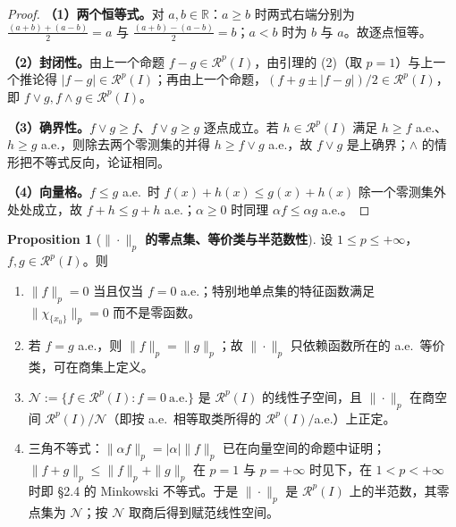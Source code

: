 \documentclass[oneside]{book}
\theoremstyle{definition}
\newcommand{\R}{\mathbb{R}}
\newcommand{\Rc}{\mathcal{R}}
\theoremstyle{definition}
\newtheorem{proposition}{Proposition}[section]
\begin{document}
	\begin{proof}
		\textbf{（1）两个恒等式。}对 $a,b\in\R$：$a\geqslant b$ 时两式右端分别为 $\frac{(a+b)+(a-b)}2=a$ 与 $\frac{(a+b)-(a-b)}2=b$；$a<b$ 时为 $b$ 与 $a$。故逐点恒等。
		
		\textbf{（2）封闭性。}由上一个命题 $f-g\in\Rc^p(I)$，由引理的 (2)（取 $p=1$）与上一个推论得 $|f-g|\in\Rc^p(I)$；再由上一个命题，$(f+g\pm|f-g|)/2\in\Rc^p(I)$，即 $f\vee g,f\wedge g\in\Rc^p(I)$。
		
		\textbf{（3）确界性。}$f\vee g\geqslant f$、$f\vee g\geqslant g$ 逐点成立。若 $h\in\Rc^p(I)$ 满足 $h\geqslant f$ a.e.、$h\geqslant g$ a.e.，则除去两个零测集的并得 $h\geqslant f\vee g$ a.e.，故 $f\vee g$ 是上确界；$\wedge$ 的情形把不等式反向，论证相同。
		
		\textbf{（4）向量格。}$f\leqslant g$ a.e.\ 时 $f(x)+h(x)\leqslant g(x)+h(x)$ 除一个零测集外处处成立，故 $f+h\leqslant g+h$ a.e.；$\alpha\geqslant0$ 时同理 $\alpha f\leqslant\alpha g$ a.e.。
	\end{proof}
	
	\begin{proposition}[\bfseries{$\|\cdot\|_p$ 的零点集、等价类与半范数性}]
		设 $1\leqslant p\leqslant+\infty$，$f,g\in\Rc^p(I)$。则
		\begin{enumerate}[leftmargin=2.4em]
			\item $\|f\|_p=0$ 当且仅当 $f=0$ a.e.；特别地单点集的特征函数满足 $\|\chi_{\{x_0\}}\|_p=0$ 而不是零函数。
			\item 若 $f=g$ a.e.，则 $\|f\|_p=\|g\|_p$；故 $\|\cdot\|_p$ 只依赖函数所在的 a.e.\ 等价类，可在商集上定义。
			\item $\mathcal N:=\{f\in\Rc^p(I):f=0\ \text{a.e.}\}$ 是 $\Rc^p(I)$ 的线性子空间，且 $\|\cdot\|_p$ 在商空间 $\Rc^p(I)/\mathcal N$（即按 a.e.\ 相等取类所得的 $\Rc^p(I)/$a.e.）上正定。
			\item 三角不等式：$\|\alpha f\|_p=|\alpha|\|f\|_p$ 已在向量空间的命题中证明；$\|f+g\|_p\leqslant\|f\|_p+\|g\|_p$ 在 $p=1$ 与 $p=+\infty$ 时见下，在 $1<p<+\infty$ 时即 §2.4 的 Minkowski 不等式。于是 $\|\cdot\|_p$ 是 $\Rc^p(I)$ 上的半范数，其零点集为 $\mathcal N$；按 $\mathcal N$ 取商后得到赋范线性空间。
		\end{enumerate}
	\end{proposition}
	
\end{document}
